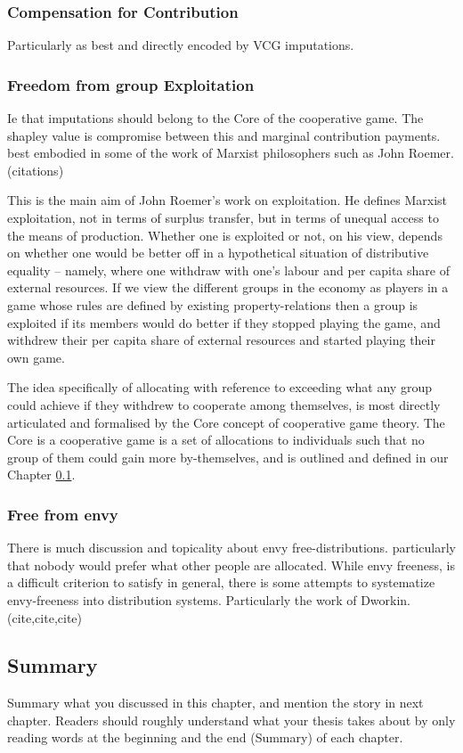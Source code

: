 \subsubsection{Compensation for Contribution}

Particularly as best and directly encoded by VCG imputations.

\subsubsection{Freedom from group Exploitation}

Ie that imputations should belong to the Core of the cooperative game.
The shapley value is compromise between this and marginal contribution payments.
best embodied in some of the work of Marxist philosophers such as John Roemer. (citations)

\begin{displayquote}
This is the main aim of John Roemer's work on exploitation. He defines Marxist exploitation, not in terms of surplus transfer, but in terms of unequal access to the means of production. Whether one is exploited or not, on his view, depends on whether one would be better off in a hypothetical situation of distributive equality -- namely, where one withdraw with one's labour and per capita share of external resources. If we view the different groups in the economy as players in a game whose rules are defined by existing property-relations then a group is exploited if its members would do better if they stopped playing the game, and withdrew their per capita share of external resources and started playing their own game.\cite{kymlicka2002contemporary}
\end{displayquote}


The idea specifically of allocating with reference to exceeding what any group could achieve if they withdrew to cooperate among themselves, is most directly articulated and formalised by the Core concept of cooperative game theory.
The Core is a cooperative game is a set of allocations to individuals such that no group of them could gain more by-themselves, and is outlined and defined in our Chapter \ref{}.


\subsubsection{Free from envy}

There is much discussion and topicality about envy free-distributions.
particularly that nobody would prefer what other people are allocated.
While envy freeness, is a difficult criterion to satisfy in general, there is some attempts to systematize envy-freeness into distribution systems.
Particularly the work of Dworkin. (cite,cite,cite)







\subsection{Summary}
Summary what you discussed in this chapter, and mention the story in next
chapter. Readers should roughly understand what your thesis takes about by only reading
words at the beginning and the end (Summary) of each chapter.



